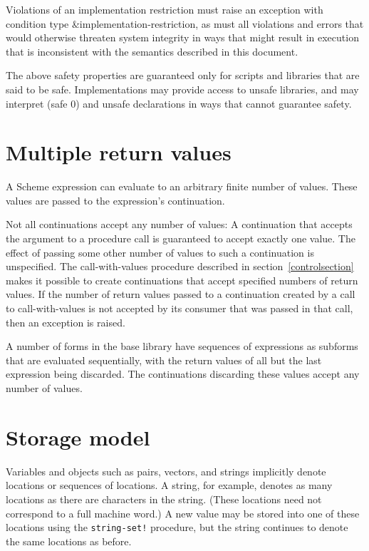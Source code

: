 Violations of an implementation restriction must raise an
exception with condition type {\cf\&implementation-restriction},
as must all
violations and errors that would otherwise threaten system
integrity in ways that might result in execution that is
inconsistent with the semantics described in this document.

The above safety properties are guaranteed only for scripts
and libraries that are said to be safe.  Implementations
may provide access to unsafe libraries, and may interpret
{\cf (safe 0)} and {\cf unsafe} declarations in ways that
cannot guarantee safety.

\section{Multiple return values}
\label{multiplereturnvaluessection}

A Scheme expression can evaluate to an arbitrary finite number of
values.  These values are passed to the expression's continuation.

Not all continuations accept any number of values: A continuation that
accepts the argument to a procedure call is guaranteed to accept
exactly one value.  The effect of passing some other number of values
to such a continuation is unspecified.  The {\cf call-with-values}
procedure
described in section~\ref{controlsection} makes it possible to create
continuations that accept specified numbers of return values.
If the number of
return values passed to a continuation created by a call to
{\cf call-with-values} is not accepted by its consumer
that was passed in that call, then an exception is raised.

A number of forms in the base library have sequences of expressions
as subforms that are evaluated sequentially, with the return values of
all but the last expression being discarded.  The continuations
discarding these values accept any number of values.

\section{Storage model}
\label{storagemodel}

Variables and objects such as pairs, vectors, and strings implicitly
denote locations or sequences of locations.  A string, for
example, denotes as many locations as there are characters in the string. 
(These locations need not correspond to a full machine word.) A new value may be
stored into one of these locations using the {\tt string-set!} procedure, but
the string continues to denote the same locations as before.

